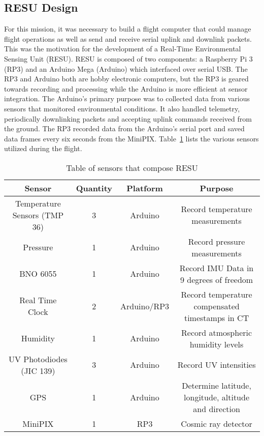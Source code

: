 \subsection{RESU Design}
\label{sec:RESU-Design}

For this mission, it was necessary to build a flight computer that could manage flight operations as well as send and receive serial uplink and downlink packets.  This was the motivation for the development of a Real-Time Environmental Sensing Unit (RESU). RESU is composed of two components: a Raspberry Pi 3 (RP3) and an Arduino Mega (Arduino) which interfaced over serial USB.  The RP3 and Arduino both are hobby electronic computers, but the RP3 is geared towards recording and processing while the Arduino is more efficient at sensor integration.  The Arduino's primary purpose was to collected data from various sensors that monitored environmental conditions. It also handled telemetry, periodically downlinking packets and accepting uplink commands received from the ground. The RP3 recorded data from the Arduino's serial port and saved data frames every six seconds from the MiniPIX.  Table~\ref{tab:Sensors} lists the various sensors utilized during the flight.

\begin{table}[h!]
\centering
\caption{Table of sensors that compose RESU}
\label{tab:Sensors}
\bigskip
\begin{tabular}{|c|c|c|c|}
\hline
\multicolumn{1}{|c|}{\bfseries Sensor} & {\bfseries Quantity} & {\bfseries Platform} & {\bfseries Purpose} \\
\hline
    Temperature Sensors (TMP 36)	& 3 & Arduino  		& Record temperature measurements  \\ \hline
    Pressure        				& 1 & Arduino 		& Record pressure measurements \\ \hline
    BNO 6055       					& 1 & Arduino 		& Record IMU Data in 9 degrees of freedom \\ \hline    
    Real Time Clock 				& 2 & Arduino/RP3 	& Record temperature compensated timestamps in CT \\\hline
    Humidity        				& 1 & Arduino 		& Record atmospheric humidity levels \\ \hline
    UV Photodiodes (JIC 139)		& 3 & Arduino 		& Record UV intensities \\ \hline 
    GPS     						& 1 & Arduino 		& Determine latitude, longitude, altitude and direction \\ \hline
    MiniPIX         				& 1 & RP3     		& Cosmic ray detector \\ \hline
\end{tabular}
\end{table}

